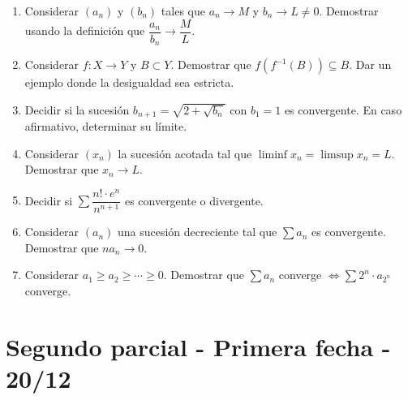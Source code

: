 \begin{enumerate}
  \item Considerar $(a_n)$ y $(b_n)$ tales que $a_n \to M$ y $b_n \to L \neq 0$. Demostrar usando la definición que $\dfrac{a_n}{b_n} \to \dfrac{M}{L}$.
  \item Considerar $f: X \to Y$ y $B \subset Y$. Demostrar que $f(f^{-1}(B)) \subseteq B$. Dar un ejemplo donde la desigualdad sea estricta.
  \item Decidir si la sucesión $b_{n+1} = \sqrt{2 + \sqrt{b_n}}$ con $b_1 = 1$ es convergente. En caso afirmativo, determinar su límite.
  \item Considerar $(x_n)$ la sucesión acotada tal que $\liminf x_n = \limsup x_n = L$. Demostrar que $x_n \to L$.
  \item Decidir si $\sum \dfrac{n! \cdot e^n}{n^{n+1}}$ es convergente o divergente.
  \item Considerar $(a_n)$ una sucesión decreciente tal que $\sum a_n$ es convergente. Demostrar que $n a_n \to 0$.
  \item Considerar $a_1 \geq a_2 \geq \cdots \geq 0$. Demostrar que $\sum a_n$ converge $\iff \sum 2^n \cdot a_{2^n}$ converge.
\end{enumerate}

\clearpage

\section{Segundo parcial - Primera fecha - 20/12}

